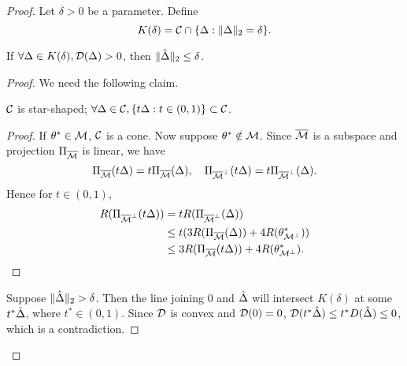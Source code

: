 \begin{proof}
    Let $\delta>0$ be a parameter. Define
    \begin{equation}
        K(\delta) = \mathcal{C} \cap \{\Delta:\|\Delta\|_2=\delta\}.
    \end{equation}

\begin{claim}
    If $\forall \Delta\in K(\delta), \mathcal{D}(\Delta)>0$, then $\|{\hat\Delta}\|_2\le\delta$.
\end{claim}

\begin{proof}

We need the following claim.

\begin{claim}
    $\mathcal{C}$ is star-shaped; \ie $\forall \Delta\in\mathcal{C}, \{t\Delta:t\in(0,1)\}\subset \mathcal{C}$.
\end{claim}

\begin{proof}
If $\theta^*\in\mathcal{M}$, $\mathcal{C}$ is a cone.
Now suppose $\theta^*\notin\mathcal{M}$.
Since ${\overline{\mathcal{M}}}$ is a subspace and projection $\Pi_{{\overline{\mathcal{M}}}}$ is linear,
we have
\begin{equation}
    \Pi_{{\overline{\mathcal{M}}}}(t\Delta) = t\Pi_{{\overline{\mathcal{M}}}}(\Delta), \quad
    \Pi_{{\overline{\mathcal{M}}}^\perp}(t\Delta) = t\Pi_{{\overline{\mathcal{M}}}^\perp}(\Delta).
\end{equation}
Hence for $t\in(0,1)$,
\begin{equation}
\begin{split}
    R(\Pi_{{\overline{\mathcal{M}}}^\perp}(t\Delta)) & = tR(\Pi_{{\overline{\mathcal{M}}}^\perp}(\Delta)) \\
        & \le t(3 R(\Pi_{{\overline{\mathcal{M}}}}(\Delta)) + 4R(\theta^*_{\mathcal{M}^\perp}))    \\
        & \le 3 R(\Pi_{{\overline{\mathcal{M}}}}(t\Delta)) + 4R(\theta^*_{\mathcal{M}^\perp}).
\end{split}
\end{equation}
\end{proof}

Suppose $\|{\hat\Delta}\|_2>\delta$.
Then the line joining $0$ and ${\hat\Delta}$ will intersect $K(\delta)$
at some $t^*{\hat\Delta}$, where $t^*\in(0,1)$.
Since $\mathcal{D}$ is convex and $\mathcal{D}(0)=0$,
$\mathcal{D}(t^*{\hat\Delta}) \le t^*D({\hat\Delta}) \le 0$,
which is a contradiction.
\end{proof}


\end{proof}
